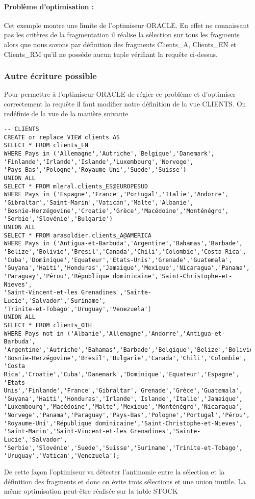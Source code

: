 \documentclass[10pt,a4paper,twoside]{article}
\begin{document}
\paragraph{Problème d'optimisation :} Cet exemple montre une limite de l'optimiseur ORACLE. En effet ne connaissant pas les critères de la fragmentation il réalise la sélection sur tous les fragments alors que nous savons par définition des fragments Clients\_A, Clients\_EN et Clients\_RM qu'il ne possède aucun tuple vérifiant la requête ci-dessus.
\subsubsection{Autre écriture possible}
Pour permettre à l'optimiseur ORACLE de régler ce problème et d'optimiser correctement la requête il faut modifier notre définition de la vue CLIENTS. On redéfinie de la vue de la manière suivante
\begin{verbatim}
-- CLIENTS
CREATE or replace VIEW clients AS 
SELECT * FROM clients_EN
WHERE Pays in ('Allemagne','Autriche','Belgique','Danemark',
'Finlande','Irlande','Islande','Luxembourg','Norvege',
'Pays-Bas','Pologne','Royaume-Uni','Suede','Suisse')
UNION ALL
SELECT * FROM mleral.clients_ES@EUROPESUD
WHERE Pays in ('Espagne','France','Portugal','Italie','Andorre',
'Gibraltar','Saint-Marin','Vatican','Malte','Albanie',
'Bosnie-Herzégovine','Croatie','Grèce','Macédoine','Monténégro',
'Serbie','Slovénie','Bulgarie')
UNION ALL
SELECT * FROM arasoldier.clients_A@AMERICA
WHERE Pays in ('Antigua-et-Barbuda','Argentine','Bahamas','Barbade',
'Belize','Bolivie','Bresil','Canada','Chili','Colombie','Costa Rica',
'Cuba','Dominique','Equateur','Etats-Unis','Grenade','Guatemala',
'Guyana','Haiti','Honduras','Jamaique','Mexique','Nicaragua','Panama',
'Paraguay','Pérou','République dominicaine','Saint-Christophe-et-Nieves',
'Saint-Vincent-et-les Grenadines','Sainte-Lucie','Salvador','Suriname',
'Trinite-et-Tobago','Uruguay','Venezuela')
UNION ALL
SELECT * FROM clients_OTH
WHERE Pays not in ('Albanie','Allemagne','Andorre','Antigua-et-Barbuda',
'Argentine','Autriche','Bahamas','Barbade','Belgique','Belize','Bolivie',
'Bosnie-Herzégovine','Bresil','Bulgarie','Canada','Chili','Colombie',
'Costa Rica','Croatie','Cuba','Danemark','Dominique','Equateur','Espagne',
'Etats-Unis','Finlande','France','Gibraltar','Grenade','Grèce','Guatemala',
'Guyana','Haiti','Honduras','Irlande','Islande','Italie','Jamaique',                  'Luxembourg','Macédoine','Malte','Mexique','Monténégro','Nicaragua',
'Norvege','Panama','Paraguay','Pays-Bas','Pologne','Portugal','Pérou',
'Royaume-Uni','République dominicaine','Saint-Christophe-et-Nieves',
'Saint-Marin','Saint-Vincent-et-les Grenadines','Sainte-Lucie','Salvador',
'Serbie','Slovénie','Suede','Suisse','Suriname','Trinite-et-Tobago',
'Uruguay','Vatican','Venezuela');
\end{verbatim}
De cette façon l'optimiseur va détecter l'antinomie entre la sélection et la définition des fragments et donc on évite trois sélections et une union inutile. La même optimisation peut-être réalisée sur la table STOCK
\end{document}
